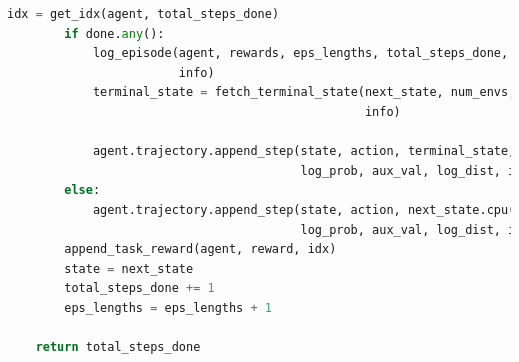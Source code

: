 \documentclass{article}
\begin{document}
\begin{lstlisting}[language=Python]
        idx = get_idx(agent, total_steps_done)
        if done.any():
            log_episode(agent, rewards, eps_lengths, total_steps_done, done,
                        info)
            terminal_state = fetch_terminal_state(next_state, num_envs, done,
                                                  info)

            agent.trajectory.append_step(state, action, terminal_state, done,
                                         log_prob, aux_val, log_dist, idx)
        else:
            agent.trajectory.append_step(state, action, next_state.cpu(), done,
                                         log_prob, aux_val, log_dist, idx)
        append_task_reward(agent, reward, idx)
        state = next_state
        total_steps_done += 1
        eps_lengths = eps_lengths + 1

    return total_steps_done
\end{lstlisting}
\end{document}
